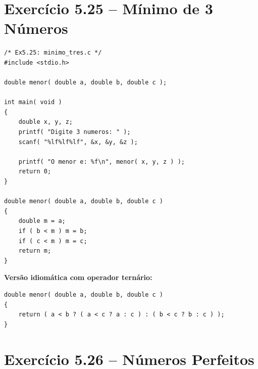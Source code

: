 \documentclass[12pt,a4paper]{article}
\begin{document}
\section{Exercício 5.25 -- Mínimo de 3 Números}

\begin{respostabox}
\begin{lstlisting}
/* Ex5.25: minimo_tres.c */
#include <stdio.h>

double menor( double a, double b, double c );

int main( void )
{
    double x, y, z;
    printf( "Digite 3 numeros: " );
    scanf( "%lf%lf%lf", &x, &y, &z );

    printf( "O menor e: %f\n", menor( x, y, z ) );
    return 0;
}

double menor( double a, double b, double c )
{
    double m = a;
    if ( b < m ) m = b;
    if ( c < m ) m = c;
    return m;
}
\end{lstlisting}

\textbf{Versão idiomática com operador ternário:}
\begin{lstlisting}
double menor( double a, double b, double c )
{
    return ( a < b ? ( a < c ? a : c ) : ( b < c ? b : c ) );
}
\end{lstlisting}
\end{respostabox}

\newpage

\section{Exercício 5.26 -- Números Perfeitos}
\end{document}
